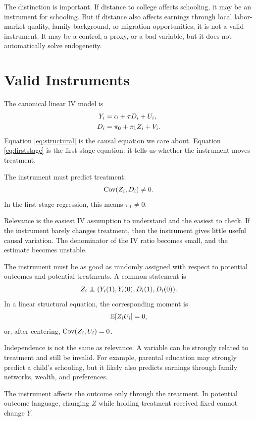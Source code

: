 The distinction is important. If distance to college affects schooling, it may
be an instrument for schooling. But if distance also affects earnings through
local labor-market quality, family background, or migration opportunities, it is
not a valid instrument. It may be a control, a proxy, or a bad variable, but it
does not automatically solve endogeneity.

\section{Valid Instruments}

The canonical linear IV model is
\begin{align}
    Y_i &= \alpha + \tau D_i + U_i, \label{eq:structural}\\
    D_i &= \pi_0 + \pi_1 Z_i + V_i. \label{eq:firststage}
\end{align}
Equation \eqref{eq:structural} is the causal equation we care about. Equation
\eqref{eq:firststage} is the first-stage equation: it tells us whether the
instrument moves treatment.

\begin{assN}[Relevance]
The instrument must predict treatment:
\[
    \operatorname{Cov}(Z_i,D_i) \neq 0.
\]
In the first-stage regression, this means $\pi_1 \neq 0$.
\end{assN}

Relevance is the easiest IV assumption to understand and the easiest to check.
If the instrument barely changes treatment, then the instrument gives little
useful causal variation. The denominator of the IV ratio becomes small, and the
estimate becomes unstable.

\begin{assN}[Independence]
The instrument must be as good as randomly assigned with respect to potential
outcomes and potential treatments. A common statement is
\[
    \Zi \independent (\Yone,\Yzero,\Done,\Dzero).
\]
In a linear structural equation, the corresponding moment is
\[
    \mathbb{E}[Z_i U_i] = 0,
\]
or, after centering, $\operatorname{Cov}(Z_i,U_i)=0$.
\end{assN}

Independence is not the same as relevance. A variable can be strongly related
to treatment and still be invalid. For example, parental education may strongly
predict a child's schooling, but it likely also predicts earnings through
family networks, wealth, and preferences.

\begin{assN}
The instrument affects the outcome only through the treatment. In potential
outcome language, changing $Z$ while holding treatment received fixed cannot
change $Y$.
\end{assN}

